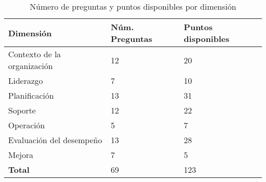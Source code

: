 
\begin{table}[H]
    \centering
    \begin{tabular}{p{5cm} | p{4.5cm} | p{4.5cm}}
        \textbf{Dimensión} & \textbf{Núm. Preguntas} & \textbf{Puntos disponibles}\\
        \hline\hline
        Contexto de la organización & 12 & 20 \\
        \hline
        Liderazgo & 7 & 10 \\
        \hline
        Planificación & 13 & 31\\
        \hline
        Soporte & 12 & 22\\
        \hline
        Operación & 5 & 7\\
        \hline
        Evaluación del desempeño & 13 & 28 \\
        \hline
        Mejora & 7 & 5\\
        \hline
        \textbf{Total} &  69 & 123\\
        \hline
    \end{tabular}
    \caption{Número de preguntas y puntos disponibles por dimensión}
    \label{tab:num-preguntas-puntos-dimension}
\end{table}
